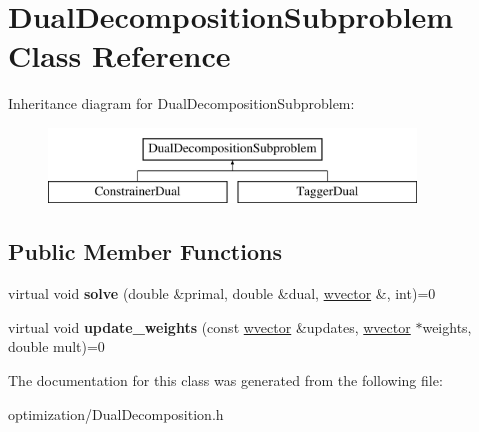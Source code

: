 \hypertarget{classDualDecompositionSubproblem}{
\section{DualDecompositionSubproblem Class Reference}
\label{classDualDecompositionSubproblem}
}
Inheritance diagram for DualDecompositionSubproblem:\begin{figure}[H]
\begin{center}
\leavevmode
\includegraphics[height=2cm]{classDualDecompositionSubproblem}
\end{center}
\end{figure}
\subsection*{Public Member Functions}
\begin{DoxyCompactItemize}
\item 
\hypertarget{classDualDecompositionSubproblem_aac234786c13091898be348dc0056a036}{
virtual void {\bfseries solve} (double \&primal, double \&dual, \hyperlink{classsvector}{wvector} \&, int)=0}
\label{classDualDecompositionSubproblem_aac234786c13091898be348dc0056a036}

\item 
\hypertarget{classDualDecompositionSubproblem_a6d26fcb23023d5b03d54b3d191531b02}{
virtual void {\bfseries update\_\-weights} (const \hyperlink{classsvector}{wvector} \&updates, \hyperlink{classsvector}{wvector} $\ast$weights, double mult)=0}
\label{classDualDecompositionSubproblem_a6d26fcb23023d5b03d54b3d191531b02}

\end{DoxyCompactItemize}


The documentation for this class was generated from the following file:\begin{DoxyCompactItemize}
\item 
optimization/DualDecomposition.h\end{DoxyCompactItemize}
